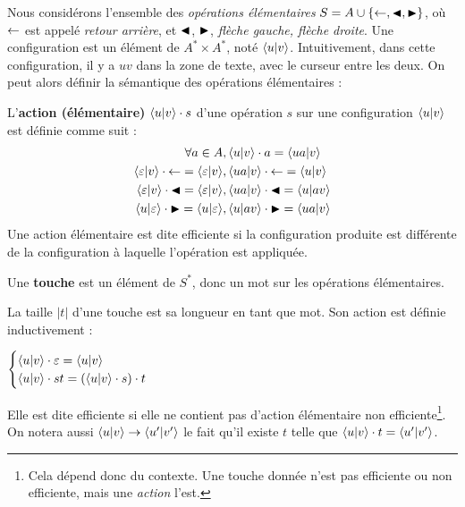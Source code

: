 \documentclass[12pt, a4paper]{article}
\begin{document}
    
    Nous considérons l’ensemble des \emph{opérations élémentaires} $S = A \cup \{\mathord{\leftarrow}, \mathord{\blacktriangleleft}, \mathord{\blacktriangleright}\}$, où $\mathord{\leftarrow}$ est appelé \emph{retour arrière}, et $\mathord{\blacktriangleleft}$, $\mathord{\blacktriangleright}$, \emph{flèche gauche, flèche droite}.
    Une configuration est un élément de $A^* \times A^*$, noté $\left\langle u \middle| v \right\rangle$. Intuitivement, dans cette configuration, il y a $uv$ dans la zone de texte, avec le curseur entre les deux.
    On peut alors définir la sémantique des opérations élémentaires :
    \begin{semopel}
        L'\textbf{action (élémentaire)} $\left\langle u \middle| v \right\rangle\cdot s$ d'une opération $s$ sur une configuration $\left\langle u \middle| v \right\rangle$ est définie comme suit :
        \begin{align*}
            \forall a \in A&, \left\langle u \middle| v \right\rangle\cdot a = \left\langle ua \middle| v \right\rangle \\
            \left\langle \varepsilon \middle| v \right\rangle\cdot \mathord{\leftarrow} = \left\langle \varepsilon \middle| v \right\rangle &, \left\langle ua \middle| v \right\rangle\cdot \mathord{\leftarrow} = \left\langle u \middle| v \right\rangle \\
            \left\langle \varepsilon \middle| v \right\rangle\cdot \mathord{\blacktriangleleft} = \left\langle \varepsilon \middle| v \right\rangle &, \left\langle ua \middle| v \right\rangle\cdot \mathord{\blacktriangleleft} = \left\langle u \middle| av \right\rangle \\
            \left\langle u \middle| \varepsilon \right\rangle\cdot \mathord{\blacktriangleright} = \left\langle u \middle| \varepsilon \right\rangle &, \left\langle u \middle| av \right\rangle\cdot \mathord{\blacktriangleright} = \left\langle ua \middle| v \right\rangle \\
        \end{align*}
        Une action élémentaire est dite efficiente si la configuration produite est différente de la configuration à laquelle l’opération est appliquée.
    \end{semopel}
    \begin{touche}[Touches]
        Une \textbf{touche} est un élément de $S^*$, donc un mot sur les opérations élémentaires. \\
    \end{touche}
    La taille $|t|$ d'une touche est sa longueur en tant que mot. Son action est définie inductivement :

    $\begin{cases}
        \left\langle u \middle| v \right\rangle\cdot \varepsilon = \left\langle u \middle| v \right\rangle \\
        \left\langle u \middle| v \right\rangle\cdot st = (\left\langle u \middle| v \right\rangle\cdot s) \cdot t
    \end{cases}$
    
    Elle est dite efficiente si elle ne contient pas d'action élémentaire non efficiente\footnote{Cela dépend donc du contexte. Une touche donnée n'est pas efficiente ou non efficiente, mais une \emph{action} l'est.}.
    On notera aussi $\left\langle u \middle| v \right\rangle \rightarrow \left\langle u' \middle| v' \right\rangle$ le fait qu'il existe $t$ telle que $\left\langle u \middle| v \right\rangle\cdot t = \left\langle u' \middle| v' \right\rangle$.
     
\end{document}
